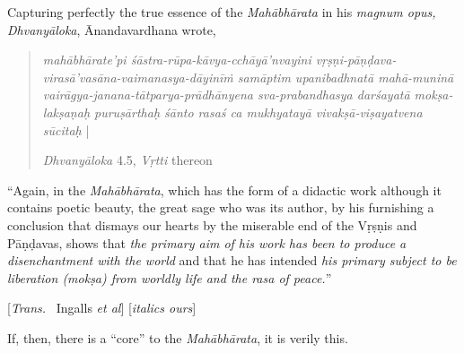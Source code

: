 Capturing perfectly the true essence of the {\sl Mahābhārata} in his {\sl magnum opus, Dhvanyāloka}, Ānandavardhana wrote, 

\begin{quote}
{{\sl mahābhārate'pi śāstra-rūpa-kāvya-cchāyā’nvayini vṛṣṇi-pāṇḍava-virasā’vasāna-vaimanasya-dāyinīṁ samāptim upanibadhnatā mahā-muninā vairāgya-janana-tātparya-prādhānyena sva-\break prabandhasya darśayatā mokṣa-lakṣaṇaḥ puruṣārthaḥ
 śānto rasaś ca mukhyatayā vivakṣā-viṣayatvena sūcitaḥ}} |\relax

\hfill {\sl Dhvanyāloka} 4.5, {\sl Vṛtti} thereon
\end{quote}

\begin{myquote}
“Again, in the {\sl Mahābhārata}, which has the form of a didactic work although it contains poetic beauty, the great sage who was its author, by his furnishing a conclusion that dismays our hearts by the miserable end of the Vṛṣṇis and Pāṇḍavas, shows that {\sl the primary aim of his work has been to produce a disenchantment with the world} and that he has intended {\sl his primary subject to be liberation (mokṣa) from worldly life and the rasa of peace.}”

\hfill [{\sl Trans.}~ Ingalls {\sl et al}] [{\sl italics ours}]
\end{myquote}

If, then, there is a “core” to the {\sl Mahābhārata}, it is verily this.  

